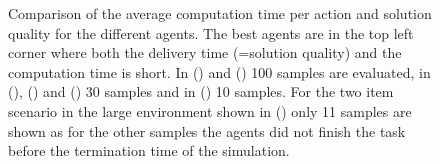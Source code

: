 \begin{figure}
    \caption{Comparison of the average computation time per action and solution quality for the different agents. The best agents are in the top left corner where both the delivery time (=solution quality) and the computation time is short. In () and () 100 samples are evaluated,  in (), () and () 30 samples and in () 10 samples. For the two item scenario in the large environment shown in () only 11 samples are shown as for the other samples the agents did not finish the task before the termination time of the simulation.}
    \label{fig:comptime_vs_solquality}
\end{figure}



